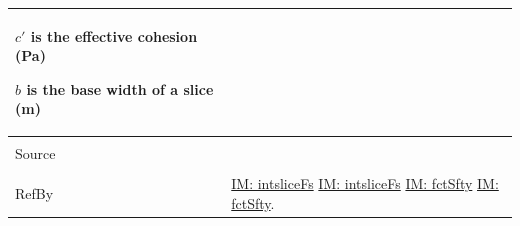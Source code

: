 \documentclass[12pt]{article}
\begin{document}
\begin{minipage}{\textwidth}
\begin{tabular}{p{} p{}}
\begin{symbDescription}
                                 \item{$c'$ is the effective cohesion (Pa)}
                                 \item{$b$ is the base width of a slice (m)}
                                 \end{symbDescription}
                                 \\ \midrule \\
                                 Source & \cite{chen2005}
                                          \\ \midrule \\
                                          RefBy & \hyperref[IM:intsliceFs]{IM: intsliceFs} \hyperref[IM:intsliceFs]{IM: intsliceFs} \hyperref[IM:fctSfty]{IM: fctSfty} \hyperref[IM:fctSfty]{IM: fctSfty}.
\\ \bottomrule \end{tabular}
\end{minipage}
\par~
\end{document}
